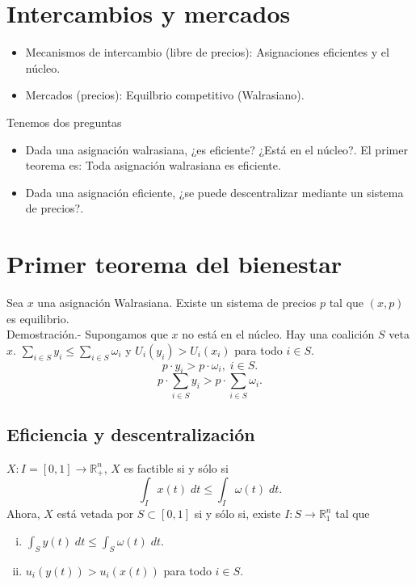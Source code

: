 \section{Intercambios y mercados}

\begin{itemize}
    \item Mecanismos de intercambio (libre de precios):
	Asignaciones eficientes y el núcleo.
    \item Mercados (precios):
	Equilbrio competitivo (Walrasiano).
\end{itemize}

Tenemos dos preguntas

\begin{itemize}
    \item Dada una asignación walrasiana, ¿es eficiente? ¿Está en el núcleo?. El primer teorema es: Toda asignación walrasiana es eficiente.
    \item Dada una asignación eficiente, ¿se puede descentralizar mediante un sistema de precios?.
\end{itemize}

\section{Primer teorema del bienestar}
\begin{teo}
    Sea $x$ una asignación Walrasiana. Existe un sistema de precios $p$ tal que $(x, p)$ es equilibrio.\\

	Demostración.-\; Supongamos que $x$ no está en el núcleo. Hay una coalición $S$ veta $x$. $\sum_{i\in S} y_i\leq \sum_{i\in S} \omega_i$ y $U_i(y_i)> U_i(x_i)$ para todo $i\in S$.
	$$p\cdot y_i > p\cdot \omega_i, \; i\in S.$$
	$$p\cdot \sum_{i\in S} y_i > p\cdot \sum_{i\in S} \omega_i.$$
\end{teo}

\subsection{Eficiencia y descentralización}
$X:I=[0,1] \to \mathbb{R}^n_+$, $X$ es factible si y sólo si
$$\int_I x(t)\; dt\leq \int_I \omega(t)\; dt.$$
Ahora, $X$ está vetada por $S\subset [0,1]$ si y sólo si, existe $I: S\to \mathbb{R}^n_1$ tal que
\begin{enumerate}[i)]
    \item $\displaystyle\int_S y(t)\; dt\leq \int_S \omega(t)\; dt$.
    \item $u_i(y(t))>u_i(x(t))$ para todo $i\in S$.
\end{enumerate}

